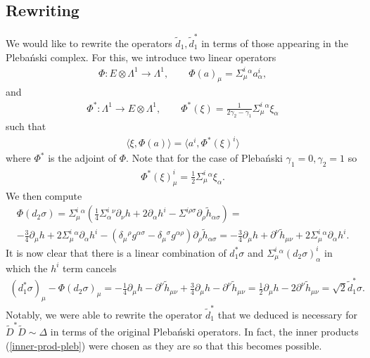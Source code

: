 \documentclass[10pt]{report}
\newcommand{\pleb}[0]{Pleba\'nski}
\theoremstyle{definition}
\begin{document}
\subsection{Rewriting} 

We would like to rewrite the operators $\tilde{d}_1, \tilde{d}_1^*$ in terms of those appearing in the \pleb{} complex. For this, we introduce two linear operators 
\begin{align}\label{Phi}
\Phi: E\otimes \Lambda^1 \to \Lambda^1, \qquad \Phi(a)_\mu = \Sigma^i_{\mu}{}^\alpha a^i_\alpha,
\end{align}
and
\begin{align}
\Phi^*: \Lambda^1 \to E\otimes \Lambda^1, \qquad \Phi^*(\xi) = \frac{1}{2 \gamma_2 - \gamma_1} \Sigma^i_\mu{}^\alpha \xi_\alpha
\end{align}
such that
\begin{align}
\langle \xi, \Phi(a) \rangle = \langle a^i, \Phi^*(\xi)^i \rangle
\end{align}
where $\Phi^*$ is the adjoint of $\Phi$.
Note that for the case of \pleb{} $\gamma_1 = 0, \gamma_2 = 1$ so
\begin{align}
\Phi^*(\xi)^i_\mu = \frac{1}{2} \Sigma^i_\mu{}^\alpha \xi_\alpha.
\end{align}
We then compute
\begin{align}\label{Phi-d2}
\Phi (d_2 \sigma)= \Sigma^i_\mu{}^\alpha( \frac{1}{4} \Sigma^i_\alpha{}^\nu \partial_\nu h +2 \partial_\alpha h^i -  \Sigma^{i\rho\sigma} \partial_\rho \tilde{h}_{\alpha\sigma}) =
 \\ \nonumber
-\frac{3}{4} \partial_\mu h + 2 \Sigma^i_\mu{}^\alpha\partial_\alpha h^i - ( \delta_\mu{}^\rho g^{\alpha\sigma} - \delta_\mu{}^\sigma g^{\alpha\rho}) \partial_\rho \tilde{h}_{\alpha\sigma} =
- \frac{3}{4} \partial_\mu h + \partial^\nu \tilde{h}_{\mu\nu} + 2 \Sigma^i_\mu{}^\alpha\partial_\alpha h^i .
\end{align}
It is now clear that there is a linear combination of $d_1^*\sigma$ and $\Sigma^i_\mu{}^\alpha (d_2 \sigma)_\alpha^i$ in which the $h^i$ term cancels
\begin{align}\label{tilde-d1-star}
(d_1^*\sigma)_\mu - \Phi (d_2 \sigma)_\mu = -\frac{1}{4}\partial_\mu h -  \partial^\nu \tilde{h}_{\mu\nu} + \frac{3}{4} \partial_\mu h - \partial^\nu \tilde{h}_{\mu\nu}
=  \frac{1}{2} \partial_\mu h-2 \partial^\nu \tilde{h}_{\mu\nu} =  \sqrt{2} \tilde{d}_1^* \sigma.
\end{align}
Notably, we were able to rewrite the operator  $\tilde{d}_1^*$ that we deduced is necessary for $\tilde{D}^* \tilde{D}\sim\Delta$ in terms of the original \pleb{} operators. In fact, the inner products (\ref{inner-prod-pleb}) were chosen as they are so that this becomes possible. 
\end{document}
